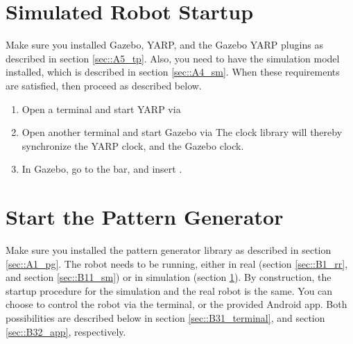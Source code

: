 \section{Simulated Robot Startup}
\label{sec::B2_ss}
Make sure you installed Gazebo, YARP, and the Gazebo YARP plugins as described in section \ref{sec::A5_tp}. Also, you need to have the simulation model installed, which is described in section \ref{sec::A4_sm}. When these requirements are satisfied, then proceed as described below.
\begin{enumerate}
	\item Open a terminal and start YARP via \newline {} \newline
	\item Open another terminal and start Gazebo via \newline {}\newline The clock library will thereby synchronize the YARP clock, and the Gazebo clock.
	\item  In Gazebo, go to the  bar, and insert .
\end{enumerate}
\section{Start the Pattern Generator}
\label{sec::B3_sp}
Make sure you installed the pattern generator library as described in section \ref{sec::A1_pg}. The robot needs to be running, either in real (section \ref{sec::B1_rr}, and section \ref{sec::B11_sm}) or in simulation (section \ref{sec::B2_ss}). By construction, the startup procedure for the simulation and the real robot is the same. You can choose to control the robot via the terminal, or the provided Android app. Both possibilities are described below in section \ref{sec::B31_terminal}, and section \ref{sec::B32_app}, respectively.
